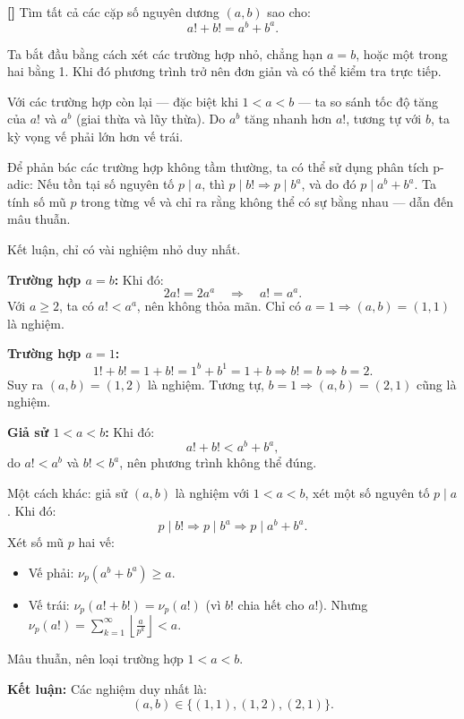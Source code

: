 \documentclass[../04-diophantine-equations.tex]{subfiles}
\begin{document}
\begin{example*}\label{example:MEMO-2015-T-P7}\textbf{[]}
	Tìm tất cả các cặp số nguyên dương \( (a, b) \) sao cho:
	\[
		a! + b! = a^b + b^a.
	\]	
\end{example*}

\begin{story*}
    Ta bắt đầu bằng cách xét các trường hợp nhỏ, chẳng hạn \( a = b \), hoặc một trong hai bằng 1.  
    Khi đó phương trình trở nên đơn giản và có thể kiểm tra trực tiếp.

    Với các trường hợp còn lại — đặc biệt khi \( 1 < a < b \) — ta so sánh tốc độ tăng của \( a! \) và \( a^b \) (giai thừa và lũy thừa).  
    Do \( a^b \) tăng nhanh hơn \( a! \), tương tự với \( b \), ta kỳ vọng vế phải lớn hơn vế trái.

    Để phản bác các trường hợp không tầm thường, ta có thể sử dụng phân tích p-adic:  
    Nếu tồn tại số nguyên tố \( p \mid a \), thì \( p \mid b! \Rightarrow p \mid b^a \), và do đó \( p \mid a^b + b^a \).  
    Ta tính số mũ \( p \) trong từng vế và chỉ ra rằng không thể có sự bằng nhau — dẫn đến mâu thuẫn.

    Kết luận, chỉ có vài nghiệm nhỏ duy nhất.
\end{story*}

\bigbreak

\begin{soln}\footnotemark
	\textbf{Trường hợp \(a = b\):} Khi đó:
	\[
		2a! = 2a^a \quad \Rightarrow \quad a! = a^a.
	\]
	Với \( a \ge 2 \), ta có \( a! < a^a \), nên không thỏa mãn.  
	Chỉ có \( a = 1 \Rightarrow (a, b) = (1, 1) \) là nghiệm.

	\textbf{Trường hợp \(a = 1\):}
	\[
		1! + b! = 1 + b! = 1^b + b^1 = 1 + b \Rightarrow b! = b \Rightarrow b = 2.
	\]
	Suy ra \( (a, b) = (1, 2) \) là nghiệm. Tương tự, \( b = 1 \Rightarrow (a, b) = (2, 1) \) cũng là nghiệm.

	\textbf{Giả sử \(1 < a < b\):} Khi đó:
	\[
		a! + b! < a^b + b^a,
	\]
	do \( a! < a^b \) và \( b! < b^a \), nên phương trình không thể đúng.

	Một cách khác: giả sử \( (a, b) \) là nghiệm với \( 1 < a < b \), xét một số nguyên tố \( p \mid a \). Khi đó:
	\[
		p \mid b! \Rightarrow p \mid b^a \Rightarrow p \mid a^b + b^a.
	\]
	Xét số mũ \( p \) hai vế:
	\begin{itemize}[topsep=0pt, partopsep=0pt, itemsep=0pt]
	    \item Vế phải: \( \nu_p(a^b + b^a) \ge a \).
	    \item Vế trái: \( \nu_p(a! + b!) = \nu_p(a!) \) (vì \( b! \) chia hết cho \( a! \)).  
	    Nhưng \( \nu_p(a!) = \sum_{k=1}^\infty \left\lfloor \frac{a}{p^k} \right\rfloor < a \).
	\end{itemize}
	Mâu thuẫn, nên loại trường hợp \( 1 < a < b \).

	\textbf{Kết luận:} Các nghiệm duy nhất là:
	\[
		\boxed{(a, b) \in \{(1, 1), (1, 2), (2, 1)\}}.
	\]
\end{soln}

\end{document}
